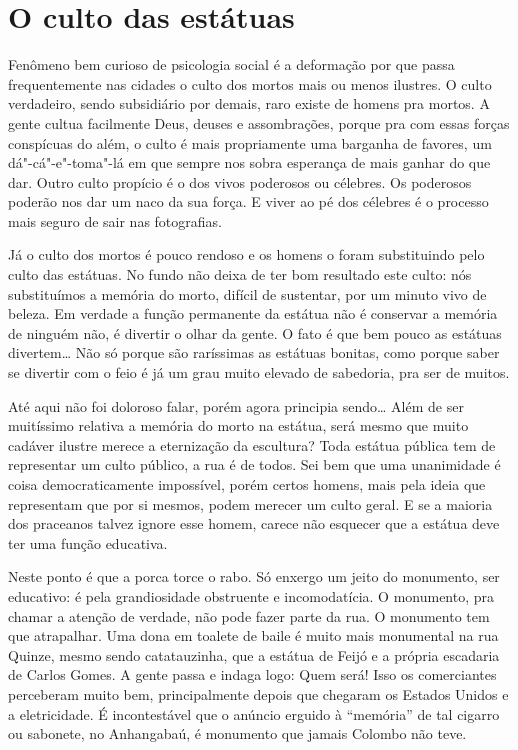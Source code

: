 \chapter{O culto das estátuas}

Fenômeno bem curioso de psicologia social é a deformação por que passa
frequentemente nas cidades o culto dos mortos mais ou menos ilustres. O
culto verdadeiro, sendo subsidiário por demais, raro existe de homens
pra mortos. A gente cultua facilmente Deus, deuses e assombrações,
porque pra com essas forças conspícuas do além, o culto é mais
propriamente uma barganha de favores, um dá"-cá"-e"-toma"-lá em que sempre
nos sobra esperança de mais ganhar do que dar. Outro culto propício é o
dos vivos poderosos ou célebres. Os poderosos poderão nos dar um naco da
sua força. E viver ao pé dos célebres é o processo mais seguro de sair
nas fotografias.

Já o culto dos mortos é pouco rendoso e os homens o foram substituindo
pelo culto das estátuas. No fundo não deixa de ter bom resultado este
culto: nós substituímos a memória do morto, difícil de sustentar, por um
minuto vivo de beleza. Em verdade a função permanente da estátua não é
conservar a memória de ninguém não, é divertir o olhar da gente. O fato
é que bem pouco as estátuas divertem\ldots{} Não só porque são raríssimas as
estátuas bonitas, como porque saber se divertir com o feio é já um grau
muito elevado de sabedoria, pra ser de muitos.

Até aqui não foi doloroso falar, porém agora principia sendo\ldots{} Além de
ser muitíssimo relativa a memória do morto na estátua, será mesmo que
muito cadáver ilustre merece a eternização da escultura? Toda estátua
pública tem de representar um culto público, a rua é de todos. Sei bem
que uma unanimidade é coisa democraticamente impossível, porém certos
homens, mais pela ideia que representam que por si mesmos, podem merecer
um culto geral. E se a maioria dos praceanos talvez ignore esse homem,
carece não esquecer que a estátua deve ter uma função educativa.

Neste ponto é que a porca torce o rabo. Só enxergo um jeito do
monumento, ser educativo: é pela grandiosidade obstruente e
incomodatícia. O monumento, pra chamar a atenção de verdade, não pode
fazer parte da rua. O monumento tem que atrapalhar. Uma dona em toalete
de baile é muito mais monumental na rua Quinze, mesmo sendo
catatauzinha, que a estátua de Feijó e a própria escadaria de Carlos
Gomes. A gente passa e indaga logo: Quem será! Isso os comerciantes
perceberam muito bem, principalmente depois que chegaram os Estados
Unidos e a eletricidade. É incontestável que o anúncio erguido à
``memória'' de tal cigarro ou sabonete, no Anhangabaú, é monumento que
jamais Colombo não teve.

